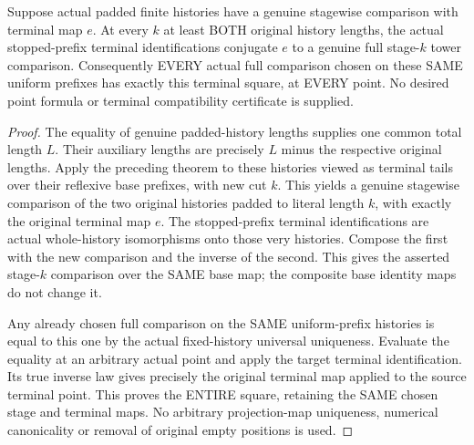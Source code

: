 \begin{theorem}
\label{hir:sharp-actual-curve-stopped-comparison-terminal-square}
\leanok
Suppose actual padded finite histories have a genuine stagewise
comparison with terminal map $e$. At every $k$ at least BOTH original
history lengths, the actual stopped-prefix terminal identifications
conjugate $e$ to a genuine full stage-$k$ tower comparison. Consequently
EVERY actual full comparison chosen on these SAME uniform prefixes has
exactly this terminal square, at EVERY point. No desired point formula
or terminal compatibility certificate is supplied.
\end{theorem}
\begin{proof}
The equality of genuine padded-history lengths supplies one common total
length $L$. Their auxiliary lengths are precisely $L$ minus the respective
original lengths. Apply the preceding theorem to these histories viewed
as terminal tails over their reflexive base prefixes, with new cut $k$.
This yields a genuine stagewise comparison of the two original histories
padded to literal length $k$, with exactly the original terminal map $e$.
The stopped-prefix terminal identifications are actual whole-history
isomorphisms onto those very histories. Compose the first with the new
comparison and the inverse of the second. This gives the asserted
stage-$k$ comparison over the SAME base map; the composite base identity
maps do not change it.

Any already chosen full comparison on the SAME uniform-prefix histories
is equal to this one by the actual fixed-history universal uniqueness.
Evaluate the equality at an arbitrary actual point and apply the target
terminal identification. Its true inverse law gives precisely the
original terminal map applied to the source terminal point. This proves
the ENTIRE square, retaining the SAME chosen stage and terminal maps.
No arbitrary projection-map uniqueness, numerical canonicality or removal
of original empty positions is used.
\end{proof}
